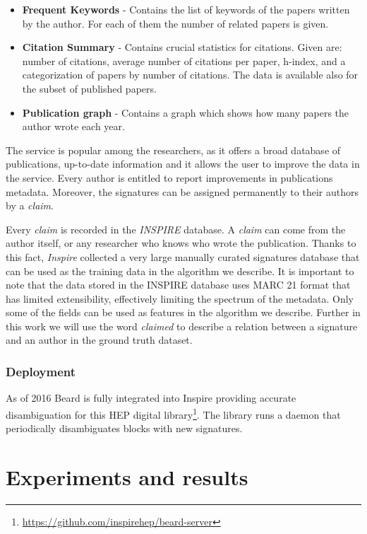 \documentclass{pracamgr}
\begin{document}
\begin{itemize}
\item \textbf{Frequent Keywords} - Contains the list of keywords of the papers written by the author. For each of them the number of related papers is given.
\item \textbf{Citation Summary} - Contains crucial statistics for citations. Given are: number of citations, average number of citations per paper, h-index, and a categorization of papers by number of citations. The data is available also for the subset of published papers.
\item \textbf{Publication graph} - Contains a graph which shows how many papers the author wrote each year.
\end{itemize}

The service is popular among the researchers, as it offers a broad database of publications, 
up-to-date information and it allows the user to improve the data in the service. Every author
is entitled to report improvements in publications metadata. Moreover, the signatures can be 
assigned permanently to their authors by a \textit{claim}. 

Every \textit{claim} is recorded in the \textit{INSPIRE} database. A \textit{claim} can come
from the author itself, or 
any researcher who knows who wrote the publication. Thanks to this fact, \textit{Inspire} 
collected a very large manually curated signatures database that can be used as the training data 
in the algorithm 
we describe. It is important to note that the data stored in the INSPIRE database uses
MARC 21 format that has limited extensibility, effectively limiting the spectrum of the
metadata. Only some of the fields can be used as features in the algorithm we describe.
Further in this work we will use the word \textit{claimed} to describe a relation between a 
signature and an author in the ground truth dataset.


\section{Deployment}

As of 2016 Beard is fully integrated into Inspire providing accurate disambiguation
for this HEP digital library\footnote{\href{https://github.com/inspirehep/beard-server}{https://github.com/inspirehep/beard-server}}. The library runs a daemon that
periodically disambiguates blocks with new signatures.

\part{Experiments and results}
\end{document}
